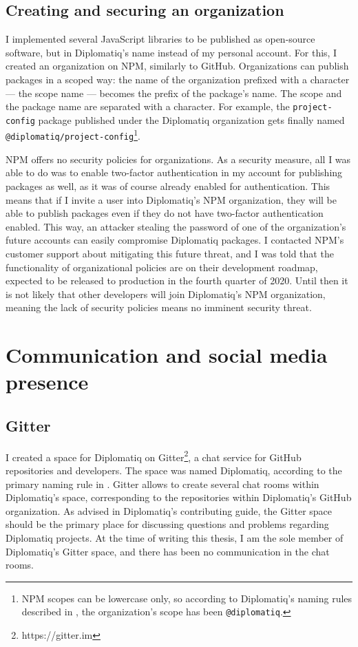 \subsection{Creating and securing an organization}

I implemented several JavaScript libraries to be published as open-source software, but in Diplomatiq's name instead of my personal account. For this, I created an organization on NPM, similarly to GitHub. Organizations can publish packages in a scoped way: the name of the organization prefixed with a  character — the scope name — becomes the prefix of the package's name. The scope and the package name are separated with a \textquote{/} character. For example, the \lstinline{project-config} package published under the Diplomatiq organization gets finally named \lstinline{@diplomatiq/project-config}\footnote{NPM scopes can be lowercase only, so according to Diplomatiq's naming rules described in , the organization's scope has been \lstinline{@diplomatiq}.}.

NPM offers no security policies for organizations. As a security measure, all I was able to do was to enable two-factor authentication in my account for publishing packages as well, as it was of course already enabled for authentication. This means that if I invite a user into Diplomatiq's NPM organization, they will be able to publish packages even if they do not have two-factor authentication enabled. This way, an attacker stealing the password of one of the organization's future accounts can easily compromise Diplomatiq packages. I contacted NPM's customer support about mitigating this future threat, and I was told that the functionality of organizational policies are on their development roadmap, expected to be released to production in the fourth quarter of 2020. Until then it is not likely that other developers will join Diplomatiq's NPM organization, meaning the lack of security policies means no imminent security threat.

\section{Communication and social media presence}

\subsection{Gitter}

I created a space for Diplomatiq on Gitter\footnote{https://gitter.im}, a chat service for GitHub repositories and developers. The space was named Diplomatiq, according to the primary naming rule in . Gitter allows to create several chat rooms within Diplomatiq's space, corresponding to the repositories within Diplomatiq's GitHub organization. As advised in Diplomatiq's contributing guide, the Gitter space should be the primary place for discussing questions and problems regarding Diplomatiq projects. At the time of writing this thesis, I am the sole member of Diplomatiq's Gitter space, and there has been no communication in the chat rooms.

